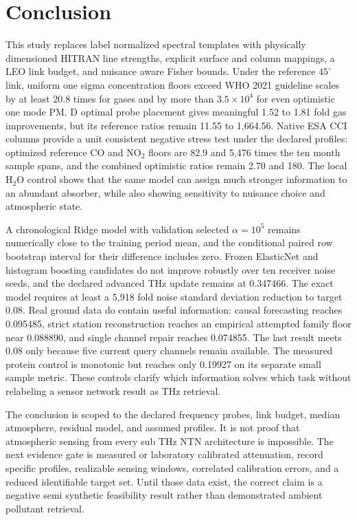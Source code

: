 \documentclass[conference]{IEEEtran}
\begin{document}
\section{Conclusion}

This study replaces label normalized spectral templates with physically dimensioned HITRAN line strengths, explicit surface and column mappings, a LEO link budget, and nuisance aware Fisher bounds. Under the reference $45^\circ$ link, uniform one sigma concentration floors exceed WHO 2021 guideline scales by at least 20.8 times for gases and by more than $3.5\times10^4$ for even optimistic one mode PM. D optimal probe placement gives meaningful 1.52 to 1.81 fold gas improvements, but its reference ratios remain 11.55 to 1,664.56. Native ESA CCI columns provide a unit consistent negative stress test under the declared profiles: optimized reference CO and NO$_2$ floors are 82.9 and 5,476 times the ten month sample spans, and the combined optimistic ratios remain 2.70 and 180. The local H$_2$O control shows that the same model can assign much stronger information to an abundant absorber, while also showing sensitivity to nuisance choice and atmospheric state.

A chronological Ridge model with validation selected $\alpha=10^5$ remains numerically close to the training period mean, and the conditional paired row bootstrap interval for their difference includes zero. Frozen ElasticNet and histogram boosting candidates do not improve robustly over ten receiver noise seeds, and the declared advanced THz update remains at 0.347466. The exact model requires at least a 5,918 fold noise standard deviation reduction to target 0.08. Real ground data do contain useful information: causal forecasting reaches 0.095485, strict station reconstruction reaches an empirical attempted family floor near 0.088890, and single channel repair reaches 0.074855. The last result meets 0.08 only because five current query channels remain available. The measured protein control is monotonic but reaches only 0.19927 on its separate small sample metric. These controls clarify which information solves which task without relabeling a sensor network result as THz retrieval.

The conclusion is scoped to the declared frequency probes, link budget, median atmosphere, residual model, and assumed profiles. It is not proof that atmospheric sensing from every sub THz NTN architecture is impossible. The next evidence gate is measured or laboratory calibrated attenuation, record specific profiles, realizable sensing windows, correlated calibration errors, and a reduced identifiable target set. Until those data exist, the correct claim is a negative semi synthetic feasibility result rather than demonstrated ambient pollutant retrieval.
\end{document}
